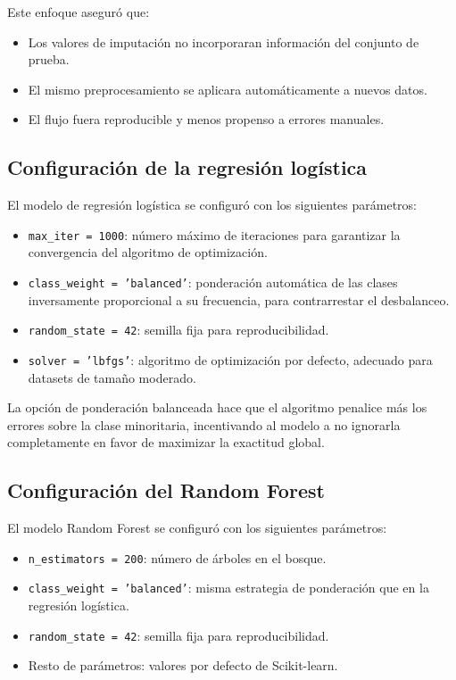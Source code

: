 \documentclass[12pt, a4paper, oneside]{report}
\begin{document}
Este enfoque aseguró que:
\begin{itemize}
    \item Los valores de imputación no incorporaran información del conjunto de prueba.
    \item El mismo preprocesamiento se aplicara automáticamente a nuevos datos.
    \item El flujo fuera reproducible y menos propenso a errores manuales.
\end{itemize}

\subsection{Configuración de la regresión logística}

El modelo de regresión logística se configuró con los siguientes parámetros:

\begin{itemize}
    \item \texttt{max\_iter = 1000}: número máximo de iteraciones para garantizar la convergencia del algoritmo de optimización.
    \item \texttt{class\_weight = 'balanced'}: ponderación automática de las clases inversamente proporcional a su frecuencia, para contrarrestar el desbalanceo.
    \item \texttt{random\_state = 42}: semilla fija para reproducibilidad.
    \item \texttt{solver = 'lbfgs'}: algoritmo de optimización por defecto, adecuado para datasets de tamaño moderado.
\end{itemize}

La opción de ponderación balanceada hace que el algoritmo penalice más los errores sobre la clase minoritaria, incentivando al modelo a no ignorarla completamente en favor de maximizar la exactitud global.

\subsection{Configuración del Random Forest}

El modelo Random Forest se configuró con los siguientes parámetros:

\begin{itemize}
    \item \texttt{n\_estimators = 200}: número de árboles en el bosque.
    \item \texttt{class\_weight = 'balanced'}: misma estrategia de ponderación que en la regresión logística.
    \item \texttt{random\_state = 42}: semilla fija para reproducibilidad.
    \item Resto de parámetros: valores por defecto de Scikit-learn.
\end{itemize}
\end{document}
